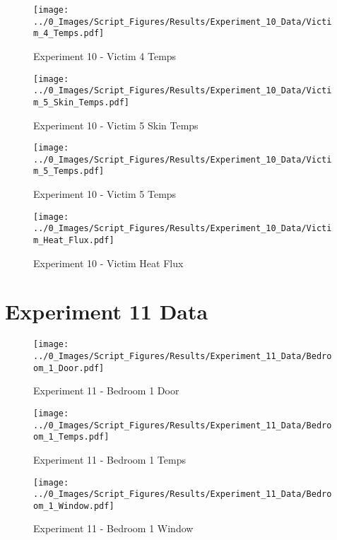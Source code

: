 	\begin{figure}[H]
		\centering
		\texttt{[image: ../0\_Images/Script\_Figures/Results/Experiment\_10\_Data/Victim\_4\_Temps.pdf]}
		\caption[]{Experiment 10 - Victim 4 Temps}
	\end{figure}
 
	\clearpage

	\begin{figure}[H]
		\centering
		\texttt{[image: ../0\_Images/Script\_Figures/Results/Experiment\_10\_Data/Victim\_5\_Skin\_Temps.pdf]}
		\caption[]{Experiment 10 - Victim 5 Skin Temps}
	\end{figure}
 

	\begin{figure}[H]
		\centering
		\texttt{[image: ../0\_Images/Script\_Figures/Results/Experiment\_10\_Data/Victim\_5\_Temps.pdf]}
		\caption[]{Experiment 10 - Victim 5 Temps}
	\end{figure}
 
	\clearpage

	\begin{figure}[H]
		\centering
		\texttt{[image: ../0\_Images/Script\_Figures/Results/Experiment\_10\_Data/Victim\_Heat\_Flux.pdf]}
		\caption[]{Experiment 10 - Victim Heat Flux}
	\end{figure}
 

\clearpage		\large
\section{Experiment 11 Data} \label{App:Exp11Results} 

	\begin{figure}[H]
		\centering
		\texttt{[image: ../0\_Images/Script\_Figures/Results/Experiment\_11\_Data/Bedroom\_1\_Door.pdf]}
		\caption[]{Experiment 11 - Bedroom 1 Door}
	\end{figure}
 

	\begin{figure}[H]
		\centering
		\texttt{[image: ../0\_Images/Script\_Figures/Results/Experiment\_11\_Data/Bedroom\_1\_Temps.pdf]}
		\caption[]{Experiment 11 - Bedroom 1 Temps}
	\end{figure}
 
	\clearpage

	\begin{figure}[H]
		\centering
		\texttt{[image: ../0\_Images/Script\_Figures/Results/Experiment\_11\_Data/Bedroom\_1\_Window.pdf]}
		\caption[]{Experiment 11 - Bedroom 1 Window}
	\end{figure}
 

